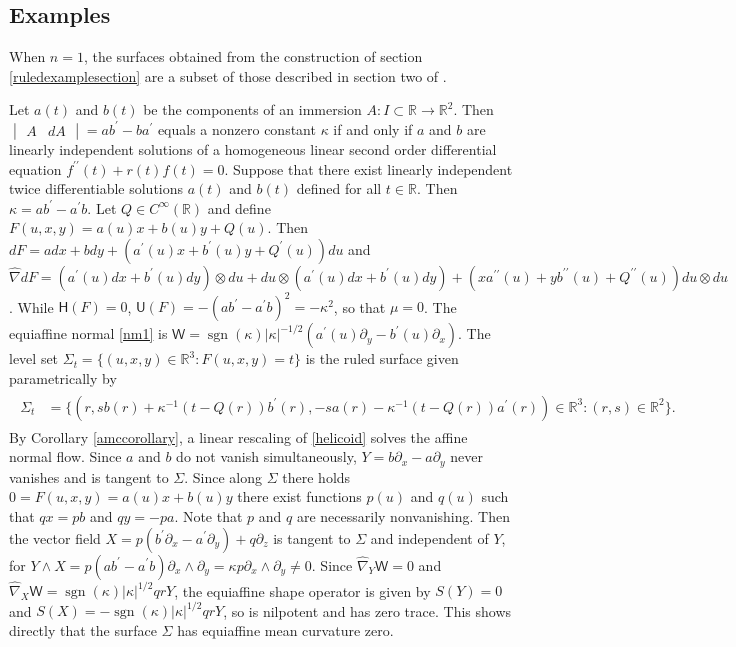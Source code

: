 \documentclass [leqno, 10pt]{amsart}
\theoremstyle{definition}
\numberwithin{equation}{section}
\newcommand{\muf}{\mu}
\newcommand{\U}{\mathsf{U}}
\renewcommand{\H}{\mathsf{H}}
\newcommand{\ka}{\kappa}
\newcommand{\nm}{\mathsf{W}}
\newcommand{\cinf}{C^{\infty}}
\newcommand{\pr}{\partial}
\newcommand{\sign}{\operatorname{sgn}}
\newcommand{\hnabla}{\widehat{\nabla}}
\newcommand{\tensor}{\otimes}
\newcommand{\rea}{\mathbb R}
\begin{document}
\subsection{Examples}\label{zamcsection}
When $n = 1$, the surfaces obtained from the construction of section \ref{ruledexamplesection} are a subset of those described in section two of \cite{Martinez-Milan}. 

Let $a(t)$ and $b(t)$ be the components of an immersion $A:I \subset \rea \to \rea^{2}$. Then $\begin{vmatrix} A & dA \end{vmatrix} = ab^{\prime} - ba^{\prime}$ equals a nonzero constant $\ka$ if and only if $a$ and $b$ are linearly independent solutions of a homogeneous linear second order differential equation $f^{\prime\prime}(t) + r(t)f(t) = 0$. Suppose that there exist linearly independent twice differentiable solutions $a(t)$ and $b(t)$ defined for all $t \in \rea$. Then $\ka = ab^{\prime} - a^{\prime}b$. Let $Q \in \cinf(\rea)$ and define $F(u, x, y) = a(u)x + b(u)y + Q(u)$. Then $dF = adx + bdy + (a^{\prime}(u)x + b^{\prime}(u)y + Q^{\prime}(u))du$ and $\hnabla dF = (a^{\prime}(u)dx  + b^{\prime}(u)dy) \tensor du + du \tensor (a^{\prime}(u)dx  + b^{\prime}(u)dy) + (xa^{\prime\prime}(u) + yb^{\prime\prime}(u) + Q^{\prime\prime}(u))du \tensor du$. While $\H(F) = 0$, $\U(F) = -(ab^{\prime} - a^{\prime}b)^{2} = -\ka^{2}$, so that $\muf = 0$. The equiaffine normal \eqref{nm1} is $\nm = \sign(\ka)|\ka|^{-1/2}(a^{\prime}(u)\pr_{y} - b^{\prime}(u)\pr_{x})$. The level set $\Sigma_{t} = \{(u, x, y) \in \rea^{3}: F(u, x, y) = t\}$ is the ruled surface given parametrically by 
\begin{align}\label{helicoid}
\begin{split}
\Sigma_{t} &= \{(r, sb(r) + \ka^{-1}(t - Q(r))b^{\prime}(r), -sa(r) - \ka^{-1}(t-Q(r))a^{\prime}(r))\in \rea^{3}: (r, s) \in \rea^{2}\}.
\end{split}
\end{align}
By Corollary \ref{amccorollary}, a linear rescaling of \eqref{helicoid} solves the affine normal flow.
Since $a$ and $b$ do not vanish simultaneously, $Y = b\pr_{x} - a\pr_{y}$ never vanishes and is tangent to $\Sigma$. Since along $\Sigma$ there holds $0 = F(u, x, y) = a(u)x + b(u) y$ there exist functions $p(u)$ and $q(u)$ such that $qx = pb$ and $qy = -pa$. Note that $p$ and $q$ are necessarily nonvanishing. Then the vector field $X = p(b^{\prime}\pr_{x} - a^{\prime}\pr_{y}) + q \pr_{z}$ is tangent to $\Sigma$ and independent of $Y$, for $Y \wedge X = p(ab^{\prime} - a^{\prime}b)\pr_{x}\wedge \pr_{y} = \ka p \pr_{x}\wedge \pr_{y} \neq 0$. Since $\hnabla_{Y}\nm = 0$ and $\hnabla_{X}\nm = \sign(\ka)|\ka|^{1/2}qr Y$, the equiaffine shape operator is given by $S(Y) = 0$ and $S(X) = -\sign(\ka)|\ka|^{1/2}qr Y$, so is nilpotent and has zero trace. This shows directly that the surface $\Sigma$ has equiaffine mean curvature zero. 
\end{document}
